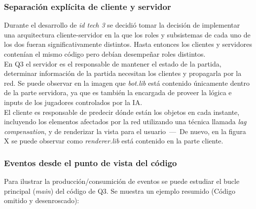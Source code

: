 \documentclass[a4paper,12pt]{report}
\begin{document}
	\subsubsection{Separación explícita de cliente y servidor}
	
	Durante el desarrollo de \textit{id tech 3} se decidió tomar la decisión de implementar una arquitectura cliente-servidor en la que los roles y subsistemas de cada uno de los dos fueran significativamente distintos. Hasta entonces los clientes y servidores contenían el mismo código pero debían desempeñar roles distintos.\\
	
	En Q3 el servidor es el responsable de mantener el estado de la partida, determinar información de la partida necesitan los clientes y propagarla por la red. Se puede observar en la imagen que \textit{bot.lib} está contenido únicamente dentro de la parte servidora, ya que es también la encargada de proveer la lógica e inputs de los jugadores controlados por la IA.\\
	
	El cliente es responsable de predecir dónde están los objetos en cada instante, incluyendo los elementos afectados por la red utilizando una técnica llamada \textit{lag compensation}, y de renderizar la vista para el usuario \,---\, De nuevo, en la figura X se puede observar como\textit{ renderer.lib} está contenido en la parte cliente. \cite{architecture}\\
	
	\subsubsection{Eventos desde el punto de vista del código}
	
	Para ilustrar la producción/consumición de eventos se puede estudiar el bucle principal (\textit{main}) del código de Q3. Se muestra un ejemplo resumido (Código omitido y desenroscado):
	
\end{document}
